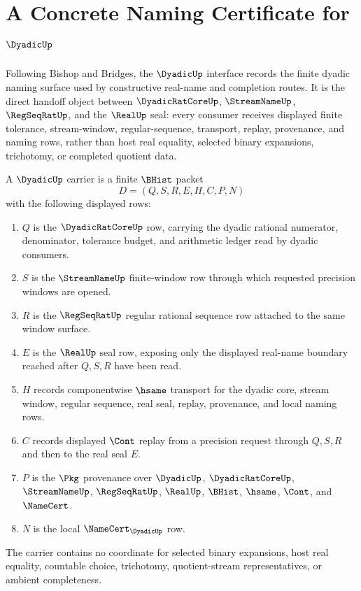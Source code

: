 \chapter{A Concrete Naming Certificate for $\DyadicUp$}
\label{ch:concrete-instances-dyadic-namecert}

Following Bishop and Bridges, the $\DyadicUp$ interface records the finite dyadic naming surface used by constructive real-name and completion routes. It is the direct handoff object between $\DyadicRatCoreUp$, $\StreamNameUp$, $\RegSeqRatUp$, and the $\RealUp$ seal: every consumer receives displayed finite tolerance, stream-window, regular-sequence, transport, replay, provenance, and naming rows, rather than host real equality, selected binary expansions, trichotomy, or completed quotient data.

\begin{definition}
\label{def:dyadic-up-carrier}
A $\DyadicUp$ carrier is a finite $\BHist$ packet
$$
D=(Q,S,R,E,H,C,P,N)
$$
with the following displayed rows:
\begin{enumerate}
\item $Q$ is the $\DyadicRatCoreUp$ row, carrying the dyadic rational numerator, denominator, tolerance budget, and arithmetic ledger read by dyadic consumers.
\item $S$ is the $\StreamNameUp$ finite-window row through which requested precision windows are opened.
\item $R$ is the $\RegSeqRatUp$ regular rational sequence row attached to the same window surface.
\item $E$ is the $\RealUp$ seal row, exposing only the displayed real-name boundary reached after $Q,S,R$ have been read.
\item $H$ records componentwise $\hsame$ transport for the dyadic core, stream window, regular sequence, real seal, replay, provenance, and local naming rows.
\item $C$ records displayed $\Cont$ replay from a precision request through $Q,S,R$ and then to the real seal $E$.
\item $P$ is the $\Pkg$ provenance over $\DyadicUp$, $\DyadicRatCoreUp$, $\StreamNameUp$, $\RegSeqRatUp$, $\RealUp$, $\BHist$, $\hsame$, $\Cont$, and $\NameCert$.
\item $N$ is the local $\NameCert_{\DyadicUp}$ row.
\end{enumerate}
The carrier contains no coordinate for selected binary expansions, host real equality, countable choice, trichotomy, quotient-stream representatives, or ambient completeness.
\end{definition}


